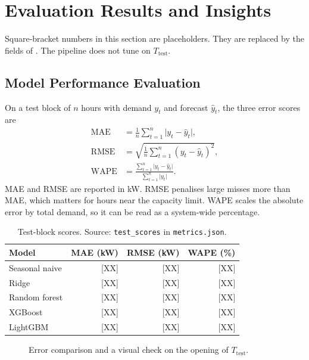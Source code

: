 \section{Evaluation Results and Insights}
\label{sec:results}

Square-bracket numbers in this section are placeholders. They are replaced
by the fields of . The pipeline
does not tune on \(T_{\mathrm{test}}\).

\subsection{Model Performance Evaluation}
\label{sec:performance}

On a test block of \(n\) hours with demand \(y_t\) and forecast
\(\hat{y}_t\), the three error scores are
\begin{align}
  \mathrm{MAE} &= \frac{1}{n}\sum_{t=1}^{n}\lvert y_t-\hat{y}_t\rvert, \label{eq:mae}\\
  \mathrm{RMSE} &= \sqrt{\frac{1}{n}\sum_{t=1}^{n}(y_t-\hat{y}_t)^2}, \label{eq:rmse}\\
  \mathrm{WAPE} &= \frac{\sum_{t=1}^{n}\lvert y_t-\hat{y}_t\rvert}{\sum_{t=1}^{n}\lvert y_t\rvert}. \label{eq:wape}
\end{align}
MAE and RMSE are reported in kW. RMSE penalises large misses more than MAE,
which matters for hours near the capacity limit. WAPE scales the absolute
error by total demand, so it can be read as a system-wide percentage.

\begin{table}[h]
  \centering
  \small
  \begin{tabular}{@{}lrrr@{}}
    \toprule
    Model & MAE (kW) & RMSE (kW) & WAPE (\%) \\
    \midrule
    Seasonal naive & [XX] & [XX] & [XX] \\
    Ridge & [XX] & [XX] & [XX] \\
    Random forest & [XX] & [XX] & [XX] \\
    XGBoost & [XX] & [XX] & [XX] \\
    LightGBM & [XX] & [XX] & [XX] \\
    \bottomrule
  \end{tabular}
  \caption{Test-block scores. Source: \texttt{test\_scores} in \texttt{metrics.json}.}
  \label{tab:scores}
\end{table}

\begin{figure}[h]
  \centering
  \caption{Error comparison and a visual check on the opening of \(T_{\mathrm{test}}\).}
  \label{fig:comparison}
\end{figure}

